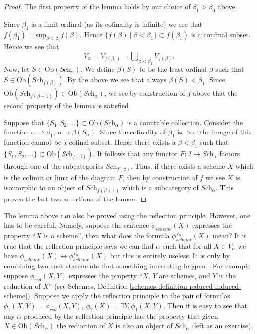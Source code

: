 \begin{proof}
\medskip\noindent
The first property of the lemma holds by our choice
of $\beta_1 > \beta_0$ above.

\medskip\noindent
Since $\beta_1$ is a limit ordinal (as its cofinality is infinite)
we see that $f(\beta_1) = \text{sup}_{\beta < \beta_1} f(\beta)$.
Hence $\{f(\beta) \mid \beta < \beta_1\} \subset f(\beta_1)$ is a
confinal subset. Hence we see that
$$
V_\alpha = V_{f(\beta_1)} = \bigcup\nolimits_{\beta < \beta_1} V_{f(\beta)}.
$$
Now, let $S \in \text{Ob}(\textit{Sch}_\alpha)$. We define
$\beta(S)$ to be the least ordinal $\beta$ such that
$S \in \text{Ob}(\textit{Sch}_{f(\beta)})$. By the above we see
that always $\beta(S) < \beta_1$. Since
$\text{Ob}(\textit{Sch}_{f(\beta + 1)}) \subset
\text{Ob}(\textit{Sch}_\alpha)$, we
see by construction of $f$ above that the second property of the lemma
is satisfied.

\medskip\noindent
Suppose that $\{S_1, S_2, \ldots\} \subset \text{Ob}(\textit{Sch}_\alpha)$
is a countable collection. Consider the function
$\omega \to \beta_1$, $n \mapsto \beta(S_n)$. Since the cofinality
of $\beta_1$ is $> \omega$ the image of this function cannot be a
cofinal subset. Hence there exists a $\beta < \beta_1$ such
that $\{S_1, S_2, \ldots\} \subset \text{Ob}(\textit{Sch}_{f(\beta)})$.
It follows that any functor $F : \mathcal{I} \to \textit{Sch}_\alpha$
factors through one of the subcategories $\textit{Sch}_{f(\beta)}$.
Thus, if there exists a scheme $X$ which is the colimit or limit
of the diagram $F$, then by construction of $f$ we see
$X$ is isomorphic to an object
of $\textit{Sch}_{f(\beta + 1)}$ which is a subcategory of
$\textit{Sch}_\alpha$. This proves the last two assertions of
the lemma.
\end{proof}

\begin{remark}
\label{remark-how-to-use-reflection}
The lemma above can also be proved using the reflection principle.
However, one has to be careful. Namely, suppose the sentence
$\phi_{scheme}(X)$ expresses the property ``$X$ is a scheme'', then
what does the formula $\phi_{scheme}^{V_\alpha}(X)$ mean?
It is true that the reflection principle says we can find $\alpha$ such that
for all $X \in V_\alpha$ we have
$\phi_{scheme}(X) \leftrightarrow \phi_{scheme}^{V_\alpha}(X)$
but this is entirely useless. It is only by combining two such
statements that something interesting happens. For example suppose
$\phi_{red}(X, Y)$ expresses the property ``$X$, $Y$ are schemes,
and $Y$ is the reduction of $X$'' (see
Schemes, Definition \ref{schemes-definition-reduced-induced-scheme}).
Suppose we apply the reflection principle to the pair of
formulas $\phi_1(X, Y) = \phi_{red}(X, Y)$,
$\phi_2(X) = \exists Y, \phi_1(X, Y)$. Then it is easy to see that
any $\alpha$ produced by the reflection principle has the property that
given $X \in \text{Ob}(\textit{Sch}_\alpha)$ the reduction of
$X$ is also an object of $\textit{Sch}_\alpha$ (left as an exercise).
\end{remark}

